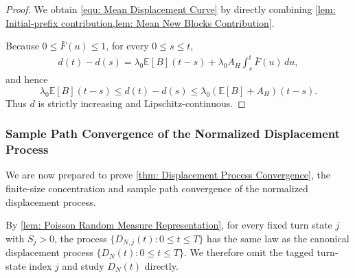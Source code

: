 \documentclass{article}
\theoremstyle{definition}
\newcommand{\E}{\mathbb E}
\begin{document}
\begin{proof}
    We obtain \eqref{equ: Mean Displacement Curve} by directly combining \cref{lem: Initial-prefix contribution,lem: Mean New Blocks Contribution}. 

    Because $0\leq\bar F(u)\leq1$, for every $0\leq s\leq t$,
    \begin{align*}
        d(t)-d(s) =\lambda_0\E[B](t-s)+ \lambda_0A_H\int_s^t\bar F(u)\,du,
    \end{align*}
    and hence
    \begin{equation*}
        \lambda_0\E[B](t-s) \leq d(t)-d(s) \leq \lambda_0(\E[B]+A_H)(t-s).
    \end{equation*}
    Thus $d$ is strictly increasing and Lipschitz-continuous.   
\end{proof}

\subsubsection{Sample Path Convergence of the Normalized Displacement Process}
\label{sssec: normalized displacement sample path convergence}

We are now prepared to prove \cref{thm: Displacement Process Convergence}, the finite-size concentration and sample path convergence of the normalized displacement process.

By \cref{lem: Poisson Random Measure Representation}, for every fixed turn state $j$ with $S_j>0$, the process $\{D_{N,j}(t):0\leq t\leq T\}$ has the same law as the canonical displacement process $\{D_N(t):0\leq t\leq T\}$. We therefore omit the tagged turn-state index $j$ and study $D_N(t)$ directly.
\end{document}

